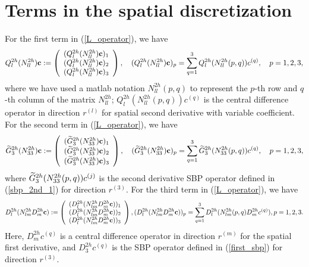 \section{Terms in the spatial discretization}\label{appendix_cdomain}
For the first term in (\ref{L_operator}), we have
\begin{align*}\label{3_8_1}
{Q}_l^{2h}({N}_{ll}^{2h}){\bf c} := \left(\begin{array}{c}
({Q}_l^{2h}({N}_{ll}^{2h}){\bf c})_1 \\
({Q}_l^{2h}({N}_{ll}^{2h}){\bf c})_2 \\
({Q}_l^{2h}({N}_{ll}^{2h}){\bf c})_3 
\end{array}\right), \quad ({Q}_l^{2h}({N}_{ll}^{2h}){\bf c})_p = \sum_{q = 1}^{3} Q_l^{2h}(N_{ll}^{2h}(p,q)) {c}^{(q)},\quad p = 1,2,3,
\end{align*}
where we have used a matlab notation $N_{ll}^{2h}(p,q)$ to represent the $p$-th row and $q$-th column of the matrix $N_{ll}^{2h}$; $Q_l^{2h}(N_{ll}^{2h}(p,q)){ c}^{(q)}$ is the central difference operator in direction $r^{(l)}$ for spatial second derivative with variable coefficient. For the second term in (\ref{L_operator}), we have
\begin{align*}\label{3_8_2}
\wt{{G}}_3^{2h}({N}_{33}^{2h}){\bf c} := \left(\begin{array}{c}
(\wt{{G}}_3^{2h}({N}_{33}^{2h}){\bf c})_1 \\
(\wt{{G}}_3^{2h}({N}_{33}^{2h}){\bf c})_2 \\
(\wt{{G}}_3^{2h}({N}_{33}^{2h}){\bf c})_3 
\end{array}\right), \quad (\wt{{G}}_3^{2h}({N}_{33}^{2h}){\bf c})_p = \sum_{q = 1}^{3} \wt{G}_3^{2h}(N_{33}^{2h}(p,q)) {c}^{(q)},\quad p = 1,2,3,
\end{align*}
where $\widetilde{G}_3^{2h}(N_{33}^{2h}(p,q)) {c}^{(j)}$ is the second derivative SBP operator  defined in (\ref{sbp_2nd_1}) for direction $r^{(3)}$. For the third term in (\ref{L_operator}), we have
\begin{align*}\label{3_8_3}
{D}_l^{2h}({N}_{lm}^{2h}{D}_m^{2h}{\bf c}) := \left(\begin{array}{c}
(D^{2h}_l(N^{2h}_{lm}D_m^{2h}{\bf c}))_1 \\
(D^{2h}_l(N^{2h}_{lm}D_m^{2h}{\bf c}))_2 \\
(D^{2h}_l(N^{2h}_{lm}D_m^{2h}{\bf c}))_3 
\end{array}\right), (D^{2h}_l(N^{2h}_{lm}D_m^{2h}{\bf c}))_p = \sum_{q = 1}^{3} D^{2h}_l(N^{2h}_{lm}(p,q)D_m^{2h}{c}^{(q)}), p = 1,2,3.
\end{align*}
Here, $D_m^{2h}c^{(q)}$ is a central difference operator in direction $r^{(m)}$ for the spatial first derivative, and $D_3^{2h}c^{(q)}$ is the SBP operator defined in (\ref{first_sbp}) for direction $r^{(3)}$.

